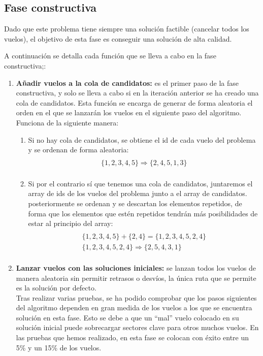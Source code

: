 \subsection{Fase constructiva}
Dado que este problema tiene siempre una solución factible (cancelar todos los vuelos), el objetivo de esta fase es conseguir una solución de alta calidad. 

A continuación se detalla cada función que se lleva a cabo en la fase constructiva;:
\begin{enumerate}
	
	\item \textbf{Añadir vuelos a la cola de candidatos:} es el primer paso de la fase constructiva, y solo se lleva a cabo si en la iteración anterior se ha creado una cola de candidatos. Esta función se encarga de generar de forma aleatoria el orden en el que se lanzarán los vuelos en el siguiente paso del algoritmo. Funciona de la siguiente manera:
	\begin{enumerate}
		\item Si no hay cola de candidatos, se obtiene el id de cada vuelo del problema y se ordenan de forma aleatoria:
		\begin{multline}\\
			\{1,2,3,4,5\} \Rightarrow \{2,4,5,1,3\}\\
		\end{multline}
		\item Si por el contrario sí que tenemos una cola de candidatos, juntaremos el array de ids de los vuelos del problema junto a el array de candidatos. posteriormente se ordenan y se descartan los elementos repetidos, de forma que los elementos que estén repetidos tendrán más posibilidades de estar al principio del array:
		\begin{multline}\\
		\{1,2,3,4,5\} + \{2,4\} = \{1,2,3,4,5,2,4\} \\
		\{1,2,3,4,5,2,4\} \Rightarrow \{2,5,4,3,1\}  \\ 
		\end{multline}
	\end{enumerate}
	
	\item \textbf{Lanzar vuelos con las soluciones iniciales: }se lanzan todos los vuelos de manera aleatoria sin permitir retrasos o desvíos, la única ruta que se permite es la solución por defecto.\\
	Tras realizar varias pruebas, se ha podido comprobar que los pasos siguientes del algoritmo dependen en gran medida de los vuelos a los que se encuentra solución en esta fase. Esto se debe a que un ``mal'' vuelo colocado en su solución inicial puede sobrecargar sectores clave para otros muchos vuelos. En las pruebas que hemos realizado, en esta fase se colocan con éxito entre un 5\% y un 15\% de los vuelos.
	

\end{enumerate}

